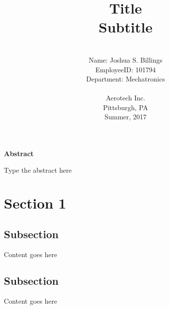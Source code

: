 \documentclass[12pt]{article}
\begin{document}
\title{{\Huge Title {\large\linebreak\\}}{\Large Subtitle\linebreak\linebreak}}
\author{\\Name: Joshua S. Billings\\
EmployeeID: 101794\\
Department: Mechatronics\\\\
Aerotech Inc.\\
Pittsburgh, PA\\
Summer, 2017\\
\date{}
}
\maketitle
\thispagestyle{empty}
\vspace{25mm}
\begin{center}
{\large\bf{Abstract}}
\end{center}

Type the abstract here

\newpage
\tableofcontents\label{toc}
\newpage


\section{Section 1}

\subsection{Subsection}
Content goes here

\subsection{Subsection}
Content goes here
\end{document}
